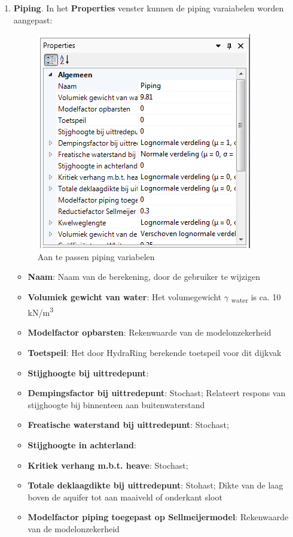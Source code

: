 \begin{enumerate}
\item \textbf{Piping}. In het \textbf{Properties} venster kunnen de piping varaiabelen worden aangepast:
\begin{figure} [H]
	\centering
		\includegraphics{figures/chapter_piping/PipingProperties}
	\caption{Aan te passen piping variabelen}
	\label{fig:piping.PipingProperties}
\end{figure}
	\begin{itemize}
	\item \textbf{Naam}: Naam van de berekening, door de gebruiker te wijzigen
	\item \textbf{Volumiek gewicht van water}: Het volumegewicht  $\gamma$ \textsubscript{water}  is ca. 10 kN/m\textsuperscript{3}
	\item \textbf{Modelfactor opbarsten}: Rekenwaarde van de modelonzekerheid
	\item \textbf{Toetspeil}: Het door HydraRing berekende toetspeil voor dit dijkvak
	\item \textbf{Stijghoogte bij uittredepunt}: 
	\item \textbf{Dempingsfactor bij uittredepunt}: Stochast; Relateert respons van stijghoogte bij binnenteen aan buitenwaterstand
	\item \textbf{Freatische waterstand bij uittredepunt}: Stochast; 
	\item \textbf{Stijghoogte in achterland}: 
	\item \textbf{Kritiek verhang m.b.t. heave}: Stochast; 
	\item \textbf{Totale deklaagdikte bij uittredepunt}: Stohast; Dikte van de laag boven de aquifer tot aan maaiveld of onderkant sloot
	\item \textbf{Modelfactor piping toegepast op Sellmeijermodel}: Rekenwaarde van de modelonzekerheid

\end{itemize}
\end{enumerate}
